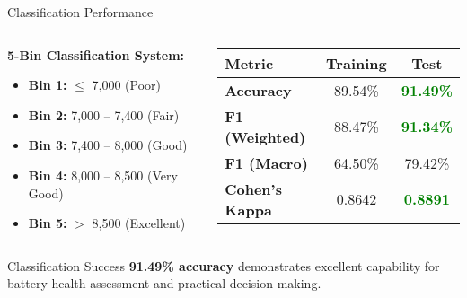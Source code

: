 \documentclass[aspectratio=169]{beamer}
\begin{document}
\begin{frame}{Classification Performance}
\begin{columns}
\begin{column}{0.5\textwidth}
\textbf{5-Bin Classification System:}
\begin{itemize}
\item \textbf{Bin 1:} $\leq$ 7,000 (Poor)
\item \textbf{Bin 2:} 7,000 -- 7,400 (Fair)
\item \textbf{Bin 3:} 7,400 -- 8,000 (Good)
\item \textbf{Bin 4:} 8,000 -- 8,500 (Very Good)
\item \textbf{Bin 5:} $>$ 8,500 (Excellent)
\end{itemize}
\end{column}
\begin{column}{0.5\textwidth}
\begin{table}[h]
\centering
\small
\begin{tabular}{@{}lcc@{}}
\toprule
\textbf{Metric} & \textbf{Training} & \textbf{Test} \\
\midrule
\textbf{Accuracy} & 89.54\% & \textcolor{green}{\textbf{91.49\%}} \\
\textbf{F1 (Weighted)} & 88.47\% & \textcolor{green}{\textbf{91.34\%}} \\
\textbf{F1 (Macro)} & 64.50\% & 79.42\% \\
\textbf{Cohen's Kappa} & 0.8642 & \textcolor{green}{\textbf{0.8891}} \\
\bottomrule
\end{tabular}
\end{table}
\end{column}
\end{columns}

\vspace{0.5cm}
\begin{block}{Classification Success}
\textbf{91.49\% accuracy} demonstrates excellent capability for battery health assessment and practical decision-making.
\end{block}
\end{frame}
\end{document}
